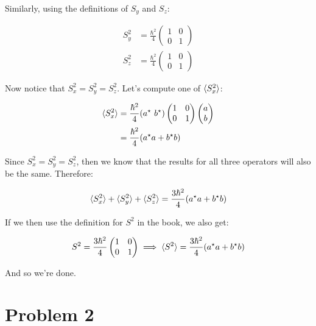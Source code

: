 \documentclass[10pt]{article}
\begin{document}
\begin{solution}
        Similarly, using the definitions of $S_y$ and $S_z$:

        \begin{align*}
            S_y^2 &= \frac{\hbar^2}{4} \begin{pmatrix}
                1 & 0 \\
                0 & 1
            \end{pmatrix}\\
            S_z^2 &= \frac{\hbar^2}{4} \begin{pmatrix}
                1 & 0 \\
                0 & 1
            \end{pmatrix}
        \end{align*}

        Now notice that $S_x^2 = S_y^2 = S_z^2$. Let's compute one of $\langle S_x^2 \rangle$: 

        \begin{align*}
            \langle S_x^2 \rangle &= \frac{\hbar^2}{4} (a^\star \ b^\star) \begin{pmatrix}
                1 & 0 \\
                0 & 1
            \end{pmatrix} \begin{pmatrix}
                a\\
                b
            \end{pmatrix} \\
            &= \frac{\hbar^2}{4} (a^\star a + b^\star b)
        \end{align*}

        Since $S_x^2 = S_y^2 = S_z^2$, then we know that the results for all three operators will also be the same. Therefore: 

        \[ \langle S_x^2 \rangle + \langle S_y^2 \rangle + \langle S_z^2 \rangle = \frac{3\hbar^2}{4} (a^\star a + b^\star b)\]

        If we then use the definition for $S^2$ in the book, we also get: 

        \[ S^2 = \frac{3\hbar^2}{4} \begin{pmatrix}
            1 & 0\\
            0 & 1
        \end{pmatrix} \implies \langle S^2 \rangle = \frac{3\hbar^2}{4}(a^\star a + b^\star b)\]

        And so we're done.
    \end{solution}
    \pagebreak 

    \section*{Problem 2}
\end{document}
